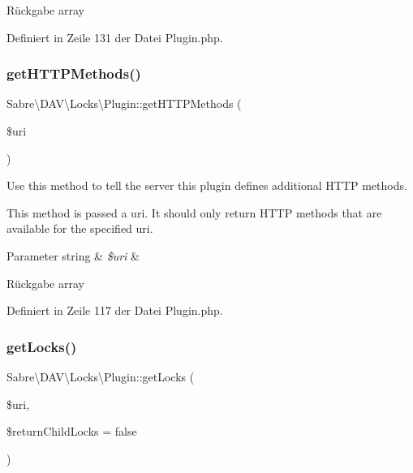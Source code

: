 \begin{DoxyReturn}{Rückgabe}
array 
\end{DoxyReturn}


Definiert in Zeile 131 der Datei Plugin.\+php.

\mbox{\label{class_sabre_1_1_d_a_v_1_1_locks_1_1_plugin_a7956ed93122098d77311dbdf79b1b90b}} 
\subsubsection{\texorpdfstring{get\+H\+T\+T\+P\+Methods()}{getHTTPMethods()}}
{\footnotesize\ttfamily Sabre\textbackslash{}\+D\+A\+V\textbackslash{}\+Locks\textbackslash{}\+Plugin\+::get\+H\+T\+T\+P\+Methods (\begin{DoxyParamCaption}\item[{}]{\$uri }\end{DoxyParamCaption})}

Use this method to tell the server this plugin defines additional H\+T\+TP methods.

This method is passed a uri. It should only return H\+T\+TP methods that are available for the specified uri.


\begin{DoxyParams}[1]{Parameter}
string & {\em \$uri} & \\
\hline
\end{DoxyParams}
\begin{DoxyReturn}{Rückgabe}
array 
\end{DoxyReturn}


Definiert in Zeile 117 der Datei Plugin.\+php.

\mbox{\label{class_sabre_1_1_d_a_v_1_1_locks_1_1_plugin_aa11d55d64b983c4dc0ee7b1a4b00fbf0}} 
\subsubsection{\texorpdfstring{get\+Locks()}{getLocks()}}
{\footnotesize\ttfamily Sabre\textbackslash{}\+D\+A\+V\textbackslash{}\+Locks\textbackslash{}\+Plugin\+::get\+Locks (\begin{DoxyParamCaption}\item[{}]{\$uri,  }\item[{}]{\$return\+Child\+Locks = {\ttfamily false} }\end{DoxyParamCaption})}

